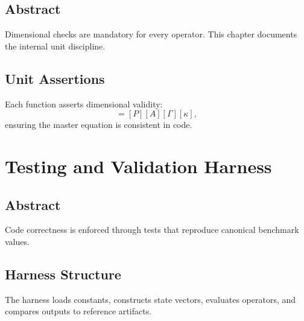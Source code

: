 \documentclass[12pt]{book}
\begin{document}
\section*{Abstract}
Dimensional checks are mandatory for every operator. This chapter documents the internal unit discipline.

\section{Unit Assertions}
Each function asserts dimensional validity:
\begin{equation}
[\dot{E}] = [P] [A] [\Gamma] [\kappa],
\end{equation}
ensuring the master equation is consistent in code.

\chapter{Testing and Validation Harness}

\section*{Abstract}
Code correctness is enforced through tests that reproduce canonical benchmark values.

\section{Harness Structure}
The harness loads constants, constructs state vectors, evaluates operators, and compares outputs to
reference artifacts.
\end{document}
